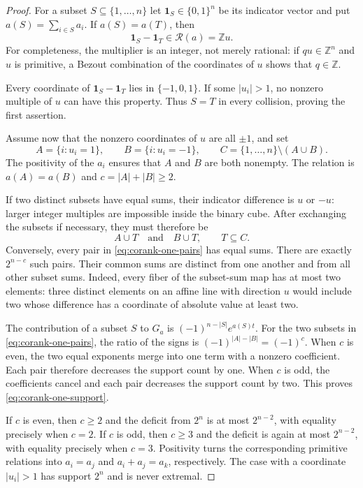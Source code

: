 \documentclass[11pt]{article}
\theoremstyle{definition}
\theoremstyle{remark}
\numberwithin{equation}{section}
\begin{document}
\begin{proof}
For a subset $S\subseteq\{1,\ldots,n\}$ let
$\mathbf1_S\in\{0,1\}^n$ be its indicator vector and put
$a(S)=\sum_{i\in S}a_i$. If $a(S)=a(T)$, then
\[
 \mathbf1_S-\mathbf1_T\in\mathcal R(a)=\mathbb Z u.
\]
For completeness, the multiplier is an integer, not merely rational:
if $q u\in\mathbb Z^n$ and $u$ is primitive, a Bezout combination of
the coordinates of $u$ shows that $q\in\mathbb Z$.

Every coordinate of $\mathbf1_S-\mathbf1_T$ lies in $\{-1,0,1\}$.
If some $|u_i|>1$, no nonzero multiple of $u$ can have this property.
Thus $S=T$ in every collision, proving the first assertion.

Assume now that the nonzero coordinates of $u$ are all $\pm1$, and
set
\[
 A=\{i:u_i=1\},\qquad B=\{i:u_i=-1\},\qquad
 C=\{1,\ldots,n\}\setminus(A\cup B).
\]
The positivity of the $a_i$ ensures that $A$ and $B$ are both nonempty.
The relation is $a(A)=a(B)$ and $c=|A|+|B|\ge2$.

If two distinct subsets have equal sums, their indicator difference is
$u$ or $-u$: larger integer multiples are impossible inside the binary
cube. After exchanging the subsets if necessary, they must therefore be
\begin{equation}
\label{eq:corank-one-pairs}
 A\cup T\quad\text{and}\quad B\cup T,
 \qquad T\subseteq C.
\end{equation}
Conversely, every pair in \eqref{eq:corank-one-pairs} has equal sums.
There are exactly $2^{n-c}$ such pairs. Their common sums are distinct
from one another and from all other subset sums. Indeed, every fiber
of the subset-sum map has at most two elements: three distinct elements
on an affine line with direction $u$ would include two whose difference
has a coordinate of absolute value at least two.

The contribution of a subset $S$ to $G_a$ is
$(-1)^{n-|S|}e^{a(S)t}$. For the two subsets in
\eqref{eq:corank-one-pairs}, the ratio of the signs is
$(-1)^{|A|-|B|}=(-1)^c$. When $c$ is even, the two equal exponents
merge into one term with a nonzero coefficient. Each pair therefore
decreases the support count by one. When $c$ is odd, the coefficients
cancel and each pair decreases the support count by two. This proves
\eqref{eq:corank-one-support}.

If $c$ is even, then $c\ge2$ and the deficit from $2^n$ is at most
$2^{n-2}$, with equality precisely when $c=2$. If $c$ is odd, then
$c\ge3$ and the deficit is again at most $2^{n-2}$, with equality
precisely when $c=3$. Positivity turns the corresponding primitive
relations into $a_i=a_j$ and $a_i+a_j=a_k$, respectively. The case
with a coordinate $|u_i|>1$ has support $2^n$ and is never extremal.
\end{proof}
\end{document}
